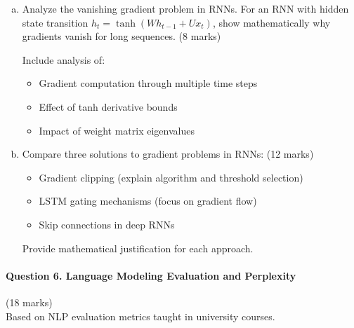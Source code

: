 \documentclass[12pt]{article}
\newcommand{\mediumanswer}{\vspace{3cm}}
\newcommand{\longanswer}{\vspace{4cm}}
\begin{document}
\begin{enumerate}[(a)]
    \item Analyze the vanishing gradient problem in RNNs. For an RNN with hidden state transition $h_t = \tanh(W h_{t-1} + U x_t)$, show mathematically why gradients vanish for long sequences. \hfill (8 marks)
    
    Include analysis of:
    \begin{itemize}
        \item Gradient computation through multiple time steps
        \item Effect of tanh derivative bounds
        \item Impact of weight matrix eigenvalues
    \end{itemize}
    
    \mediumanswer
    
    \item Compare three solutions to gradient problems in RNNs: \hfill (12 marks)
    \begin{itemize}
        \item Gradient clipping (explain algorithm and threshold selection)
        \item LSTM gating mechanisms (focus on gradient flow)
        \item Skip connections in deep RNNs
    \end{itemize}
    
    Provide mathematical justification for each approach.
    
    \longanswer
\end{enumerate}

\newpage
\paragraph{Question 6. Language Modeling Evaluation and Perplexity}\hfill (18 marks)\\
Based on NLP evaluation metrics taught in university courses.
\end{document}
